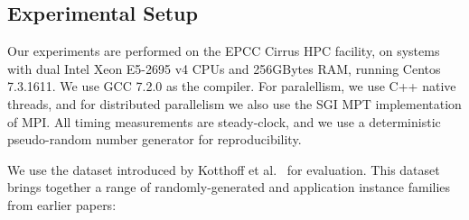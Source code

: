 \documentclass[runningheads]{llncs}
\newcommand{\siplineref}[1]{line~\ref{line:sip:#1}}
\newcommand{\citet}[2]{#1\cite{#2}}
\begin{document}

\subsection{Experimental Setup}

Our experiments are performed on the EPCC Cirrus HPC facility, on systems with dual Intel Xeon
E5-2695 v4 CPUs and 256GBytes RAM, running Centos 7.3.1611. We use GCC 7.2.0 as the compiler. For
paralellism, we use C++ native threads, and for distributed parallelism we also use the SGI MPT
implementation of MPI. All timing measurements are steady-clock, and we use a deterministic
pseudo-random number generator for reproducibility.

We use the dataset introduced by \citet{Kotthoff et al.\ }{DBLP:conf/lion/KotthoffMS16} for
evaluation. This dataset brings together a range of randomly-generated and application instance
families from earlier papers:
\end{document}
